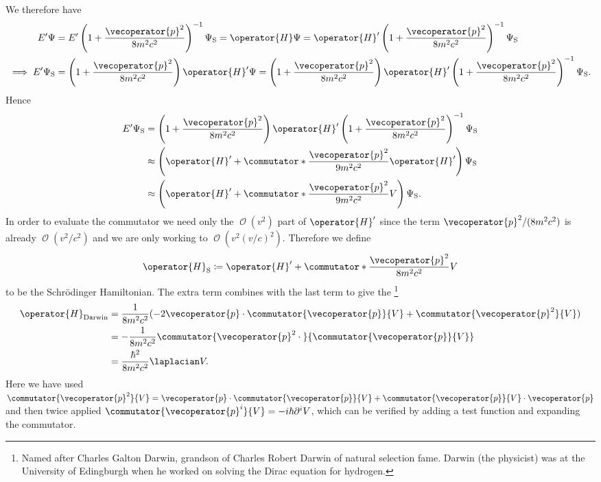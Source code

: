 \documentclass[fleqn]{NotesClass}
\newcommand*{\order}{\mathop{\mathcal{O}}}
\newcommand*{\hamiltonian}{H}
\begin{document}
    We therefore have
    \begin{align}
        E'\Psi &= E'\left( 1 + \frac{\vecoperator{p}^2}{8m^2c^2} \right)^{-1}\Psi_{\mathrm{S}} = \operator{\hamiltonian}\Psi = \operator{\hamiltonian}'\left( 1 + \frac{\vecoperator{p}^2}{8m^2c^2} \right)^{-1}\Psi_{\mathrm{S}}\\
        \implies E'\Psi_{\mathrm{S}} &= \left( 1 + \frac{\vecoperator{p}^2}{8m^2c^2} \right)\operator{\hamiltonian}'\Psi = \left( 1 + \frac{\vecoperator{p}^2}{8m^2c^2} \right) \operator{\hamiltonian}' \left( 1 + \frac{\vecoperator{p}^2}{8m^2c^2} \right)^{-1}\Psi_{\mathrm{S}}.
    \end{align}
    Hence
    \begin{align}
        E'\Psi_{\mathrm{S}} &= \left( 1 + \frac{\vecoperator{p}^2}{8m^2c^2} \right) \operator{\hamiltonian}' \left( 1 + \frac{\vecoperator{p}^2}{8m^2c^2} \right)^{-1} \Psi_{\mathrm{S}}\\
        &\approx \left( \operator{\hamiltonian}' + \commutator*{\frac{\vecoperator{p}^2}{9m^2c^2}}{\operator{\hamiltonian}'} \right)\Psi_{\mathrm{S}}\\
        &\approx \left( \operator{\hamiltonian}' + \commutator*{\frac{\vecoperator{p}^2}{9m^2c^2}}{V} \right)\Psi_{\mathrm{S}}.
    \end{align}
    In order to evaluate the commutator we need only the \(\order(v^2)\) part of \(\operator{\hamiltonian}'\) since the term \(\vecoperator{p}^2/(8m^2c^2)\) is already \(\order(v^2/c^2)\) and we are only working to \(\order(v^2(v/c)^2)\).
    Therefore we define
    \begin{equation}
        \operator{\hamiltonian}_{\mathrm{S}} \coloneqq \operator{\hamiltonian}' + \commutator*{\frac{\vecoperator{p}^2}{8m^2c^2}}{V}
    \end{equation}
    to be the Schr\"odinger Hamiltonian.
    The extra term combines with the last term to give the \footnote{Named after Charles Galton Darwin, grandson of Charles Robert Darwin of natural selection fame. Darwin (the physicist) was at the University of Edingburgh when he worked on solving the Dirac equation for hydrogen.}
    \begin{align}
        \operator{\hamiltonian}_{\mathrm{Darwin}} &= \frac{1}{8m^2c^2} (-2\vecoperator{p} \cdot \commutator{\vecoperator{p}}{V} + \commutator{\vecoperator{p}^2}{V})\\
        &= -\frac{1}{8m^2c^2} \commutator{\vecoperator{p}^2 \cdot {}}{\commutator{\vecoperator{p}}{V}}\\
        &= \frac{\hbar^2}{8m^2c^2} \laplacian V.
    \end{align}
    Here we have used \(\commutator{\vecoperator{p}^2}{V} = \vecoperator{p} \cdot \commutator{\vecoperator{p}}{V} + \commutator{\vecoperator{p}}{V} \cdot \vecoperator{p}\) and then twice applied \(\commutator{\vecoperator{p}^i}{V} = -i\hbar\partial^iV\), which can be verified by adding a test function and expanding the commutator.
    
\end{document}
